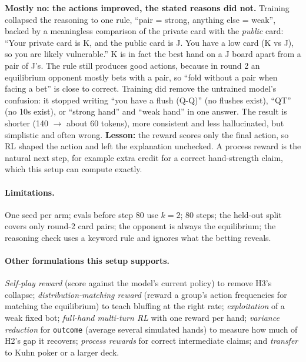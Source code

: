 \documentclass[10.5pt]{article}
\newcommand{\code}[1]{\texttt{#1}}
\begin{document}
\textbf{Mostly no: the actions improved, the stated reasons did not.} Training collapsed the reasoning to one rule, ``pair
= strong, anything else = weak'', backed by a meaningless comparison of the private card with the \emph{public} card:
``Your private card is K, and the public card is J. You have a low card (K vs J), so you are likely vulnerable.'' K is in
fact the best hand on a J board apart from a pair of J's. The rule still produces good actions, because in round 2 an
equilibrium opponent mostly bets with a pair, so ``fold without a pair when facing a bet'' is close to correct.
Training did remove the untrained model's confusion: it stopped writing ``you have a flush (Q-Q)'' (no flushes exist),
``QT'' (no 10s exist), or ``strong hand'' and ``weak hand'' in one answer. The result is shorter (140 $\to$ about 60 tokens),
more consistent and less hallucinated, but simplistic and often wrong. \textbf{Lesson:} the reward scores only the final
action, so RL shaped the action and left the explanation unchecked. A process reward is the natural next step, for
example extra credit for a correct hand-strength claim, which this setup can compute exactly.

\paragraph{Limitations.} One seed per arm; evals before step 80 use $k=2$; 80 steps; the held-out split covers only round-2
card pairs; the opponent is always the equilibrium; the reasoning check uses a keyword rule and ignores what the betting reveals.

\paragraph{Other formulations this setup supports.} \emph{Self-play reward} (score against the model's current policy) to
remove H3's collapse; \emph{distribution-matching reward} (reward a group's action frequencies for matching the equilibrium)
to teach bluffing at the right rate; \emph{exploitation} of a weak fixed bot; \emph{full-hand multi-turn RL} with one reward
per hand; \emph{variance reduction} for \code{outcome} (average several simulated hands) to measure how much of H2's gap it
recovers; \emph{process rewards} for correct intermediate claims; and \emph{transfer} to Kuhn poker or a larger deck.
\end{document}
